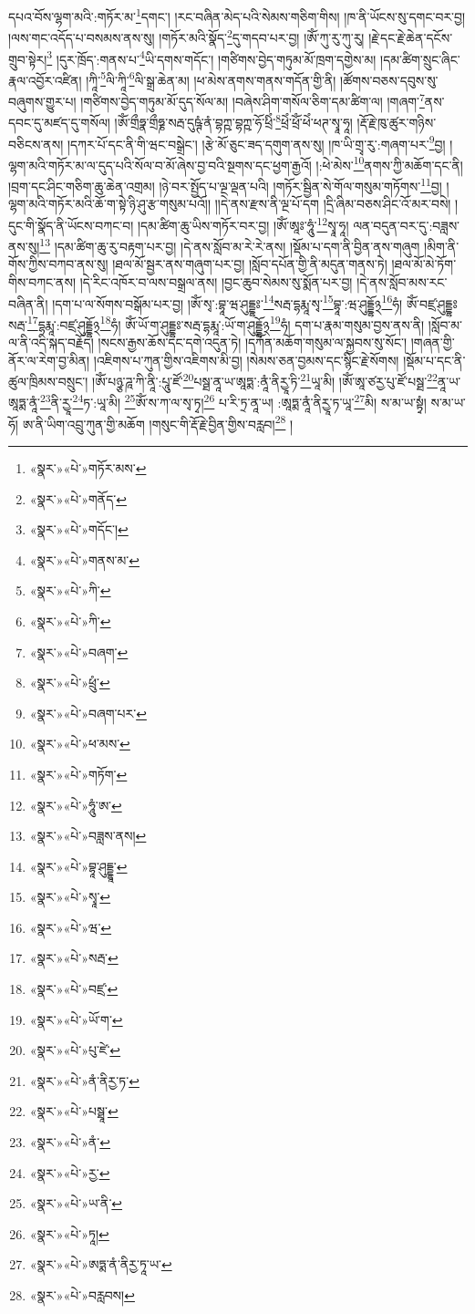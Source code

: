 དཔའ་བོས་ལྷག་མའི་:གཏོར་མ་\footnote{«སྣར་»«པེ་»གཏོར་མས་}དགང་། །རང་བཞིན་མེད་པའི་སེམས་གཅིག་གིས། །ཁ་ནི་ཡོངས་སུ་དགང་བར་བྱ། །ལས་གང་འདོད་པ་བསམས་ནས་སུ། །གཏོར་མའི་སྣོད་\footnote{«སྣར་»«པེ་»གནོད་}དུ་གདབ་པར་བྱ། །ཨོཾ་ཀུ་རུ་ཀུ་རུ། །རྗེ་དང་རྗེ་ཆེན་དངོས་གྲུབ་སྟེར།\footnote{«སྣར་»«པེ་»གདོང་།} །དུར་ཁྲོད་:གནས་པ་\footnote{«སྣར་»«པེ་»གནས་མ་}ཡི་དགས་གདོང་། །གཙིགས་བྱེད་གཏུམ་མོ་ཁྲག་དགྱེས་མ། །དམ་ཚིག་སྲུང་ཞིང་རྣལ་འབྱོར་འཛིན། །ཀཱི་\footnote{«སྣར་»«པེ་»ཀི་}ལི་ཀཱི་\footnote{«སྣར་»«པེ་»ཀི་}ལི་སྒྲ་ཆེན་མ། །ཕ་མེས་ནགས་གནས་གདོན་གྱི་ནི། །ཚོགས་བཅས་དབུས་སུ་བཞུགས་གྱུར་པ། །གཙིགས་བྱེད་གཏུམ་མོ་དུད་སོལ་མ། །བཞེས་ཤིག་གསོལ་ཅིག་དམ་ཚིག་ལ། །གཞག་\footnote{«སྣར་»«པེ་»བཞག་}ནས་དབང་དུ་མཛད་དུ་གསོལ། །ཨོཾ་གྲྀཧྣ་གྲྀཧྞ་སརྦ་དུཥྚཾ་ནཾ་བྷཀྵ་བྷཀྵ་ཧོ་ཕྲིཾ་\footnote{«སྣར་»«པེ་»ཕྲུཾ་}ཕྲེཾ་ཕྲོཾ་ཕེཾ་ཕཊ་སྭཱ་ཧཱ། །རྡོ་རྗེ་ཁུ་ཚུར་གཉིས་བཅིངས་ནས། །དཀར་པོ་དང་ནི་གི་ཝང་བསྒྲེང་། །རྩེ་མོ་ཅུང་ཟད་དགུག་ནས་སུ། །ཁ་ཡི་གྲྭ་རུ་:གཞག་པར་\footnote{«སྣར་»«པེ་»བཞག་པར་}བྱ། །ལྷག་མའི་གཏོར་མ་ལ་དུད་པའི་སོལ་བ་མོ་ཞེས་བྱ་བའི་སྔགས་དང་ཕྱག་རྒྱའོ། །:ཕེ་མེས་\footnote{«སྣར་»«པེ་»ཕ་མས་}ནགས་ཀྱི་མཆོག་དང་ནི། །བྲག་དང་ཤིང་གཅིག་ཆུ་ཆེན་འགྲམ། །ཉེ་བར་སྤྱོད་པ་ལྔ་ལྡན་པའི། །གཏོར་སྦྱིན་སེ་གོལ་གསུམ་གཏོགས་\footnote{«སྣར་»«པེ་»གཏོག་}བྱ། །ལྷག་མའི་གཏོར་མའི་ཆོ་ག་སྟེ་ཉི་ཤུ་རྩ་གསུམ་པའོ།། །།དེ་ནས་རྫས་ནི་ལྔ་པོ་དག །དྲི་ཞིམ་བཅས་ཤིང་འོ་མར་བསེ། །དུང་གི་སྣོད་ནི་ཡོངས་བཀང་བ། །དམ་ཚིག་ཆུ་ཡིས་གཏོར་བར་བྱ། །ཨོཾ་ཨཱཿ་ཧཱུཾ་\footnote{«སྣར་»«པེ་»ཧཱུཾ་ཨ་}སྭཱ་ཧཱ། ལན་བདུན་བར་དུ་:བཟླས་ནས་སུ།\footnote{«སྣར་»«པེ་»བཟླས་ནས།} །དམ་ཚིག་ཆུ་རུ་བརྟག་པར་བྱ། །དེ་ནས་སློབ་མ་རེ་རེ་ནས། །སྡོམ་པ་དག་ནི་བྱིན་ནས་གཞུག །མིག་ནི་གོས་ཀྱིས་བཀབ་ནས་སུ། །ཐལ་མོ་སྦྱར་ནས་གཞུག་པར་བྱ། །སློབ་དཔོན་གྱི་ནི་མདུན་གནས་ཏེ། །ཐལ་མོ་མེ་ཏོག་གིས་བཀང་ནས། །དེ་རིང་འཁོར་བ་ལས་བསྒྲལ་ནས། །བྱང་ཆུབ་སེམས་སུ་སྨོན་པར་བྱ། །དེ་ནས་སློབ་མས་རང་བཞིན་ནི། །དག་པ་ལ་སོགས་བསྒོམ་པར་བྱ། །ཨོཾ་སྭ་:བྷཱ་ཝ་ཤུདྡྷཿ་\footnote{«སྣར་»«པེ་»བྷཱ་ཤུདྡྷཱ་}སརྦ་དྷརྨཱ་སྭ་\footnote{«སྣར་»«པེ་»སྭཱ་}བྷཱ་:ཝ་ཤུདྡྷོ྅\footnote{«སྣར་»«པེ་»ཝ་}ཧཾ། ཨོཾ་བཛྲ་ཤུདྡྷཿསརྦ་\footnote{«སྣར་»«པེ་»སརྦ་}དྷརྨཱ་:བཛྲ་ཤུདྡྷོ྅\footnote{«སྣར་»«པེ་»བཛྲ་}ཧཾ། ཨོཾ་ཡོ་ག་ཤུདྡྷཿ་སརྦ་དྷརྨཱ་:ཡོ་ག་ཤུདྡྷོ྅\footnote{«སྣར་»«པེ་»ཡོ་ག་}ཧཾ། དག་པ་རྣམ་གསུམ་བྱས་ནས་ནི། །སློབ་མ་ལ་ནི་འདི་སྐད་བརྗོད། །སངས་རྒྱས་ཆོས་དང་དགེ་འདུན་ཏེ། །དཀོན་མཆོག་གསུམ་ལ་སྐྱབས་སུ་སོང་། །གཞན་གྱི་ནོར་ལ་རེག་བྱ་མིན། །འཇིགས་པ་ཀུན་གྱིས་འཇིགས་མི་བྱ། །སེམས་ཅན་བྱམས་དང་སྙིང་རྗེ་སོགས། །སྡོམ་པ་དང་ནི་ཚུལ་ཁྲིམས་བསྲུང་། །ཨོཾ་པཉྩ་ཌཱ་ཀི་ནཱི་:པཱུ་ཛོ་\footnote{«སྣར་»«པེ་»པུ་ཛེ་}པསྠ་ནཱ་ཡ་ཨཱཏྨ་:ནཱཾ་ནིརྱཱ་ཏི་\footnote{«སྣར་»«པེ་»ནཾ་ནིརྱ་ཏ་}ཡཱ་མི། །ཨོཾ་ཨཱ་ཙརྱ་པུ་ཛོ་པསྠ་\footnote{«སྣར་»«པེ་»པསྠཱ་}ནཱ་ཡ་ཨཱཏྨ་ནཱཾ་\footnote{«སྣར་»«པེ་»ནཾ་}ནི་རྱཱ་\footnote{«སྣར་»«པེ་»རྱ་}ཏ་:ཡཱ་མི། \footnote{«སྣར་»«པེ་»ཡ་ནི་}ཨོཾ་ས་ཀ་ལ་སྭ་ཏྭ།\footnote{«སྣར་»«པེ་»ཏཱ།} པ་རི་ཏྲ་ནཱ་ཡ། :ཨཱཏྨ་ནཱཾ་ནིརྱཱ་ཏ་ཡཱ་\footnote{«སྣར་»«པེ་»ཨཏྨ་ནཾ་ནིརྱ་ཏཱ་ཡ་}མི། ས་མ་ཡ་སྟྭཾ། ས་མ་ཡ་ཧོ། ཨ་ནི་ཡིག་འབྲུ་ཀུན་གྱི་མཆོག །གསུང་གི་རྡོ་རྗེ་བྱིན་གྱིས་བརླབ།\footnote{«སྣར་»«པེ་»བརླབས།} །
